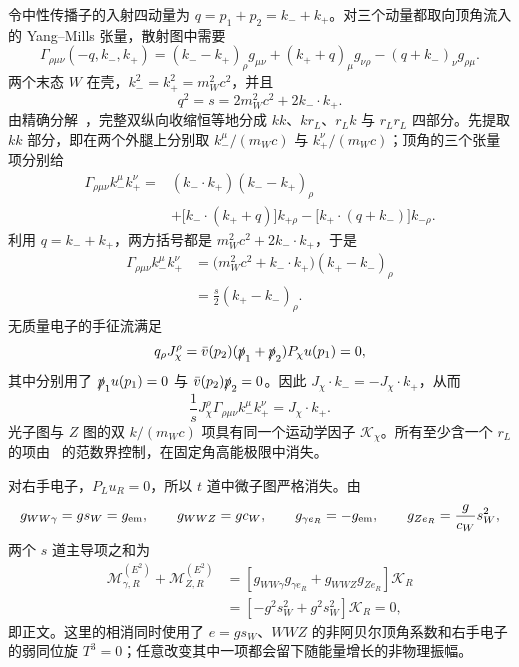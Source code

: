 \begin{derivation}
令中性传播子的入射四动量为 $q=p_1+p_2=k_-+k_+$。对三个动量都取向顶角流入的 Yang--Mills 张量，散射图中需要
\begin{equation*}
\Gamma_{\rho\mu\nu}(-q,k_-,k_+)
=(k_--k_+)_\rho g_{\mu\nu}
 +(k_++q)_\mu g_{\nu\rho}
 -(q+k_-)_\nu g_{\rho\mu}.
\end{equation*}
两个末态 $W$ 在壳，$k_-^2=k_+^2=m_W^2c^2$，并且
\begin{equation*}
q^2=s=2m_W^2c^2+2k_-\!\cdot k_+.
\end{equation*}
由精确分解~，完整双纵向收缩恒等地分成 $kk$、$kr_L$、$r_Lk$ 与 $r_Lr_L$ 四部分。先提取 $kk$ 部分，即在两个外腿上分别取 $k_-^\mu/(m_Wc)$ 与 $k_+^\nu/(m_Wc)$；顶角的三个张量项分别给
\begin{align*}
\Gamma_{\rho\mu\nu}k_-^\mu k_+^\nu
={}&(k_-\!\cdot k_+)(k_--k_+)_\rho\\
&+\bigl[k_-\!\cdot(k_++q)\bigr]k_{+\rho}
-\bigl[k_+\!\cdot(q+k_-)\bigr]k_{-\rho}.
\end{align*}
利用 $q=k_-+k_+$，两方括号都是 $m_W^2c^2+2k_-\!\cdot k_+$，于是
\begin{align*}
\Gamma_{\rho\mu\nu}k_-^\mu k_+^\nu
&=\bigl(m_W^2c^2+k_-\!\cdot k_+\bigr)(k_+-k_-)_\rho\\
&=\frac{s}{2}(k_+-k_-)_\rho .
\end{align*}
无质量电子的手征流满足
\begin{equation*}
q_\rho J_\chi^\rho
=\bar v(p_2)(\slashed p_1+\slashed p_2)P_\chi u(p_1)=0,
\end{equation*}
其中分别用了 $\slashed p_1u(p_1)=0$ 与 $\bar v(p_2)\slashed p_2=0$。因此 $J_\chi\!\cdot k_-=-J_\chi\!\cdot k_+$，从而
\begin{equation*}
\frac{1}{s}J_\chi^\rho
\Gamma_{\rho\mu\nu}k_-^\mu k_+^\nu
=J_\chi\!\cdot k_+.
\end{equation*}
光子图与 $Z$ 图的双 $k/(m_Wc)$ 项具有同一个运动学因子 $\mathcal K_\chi$。所有至少含一个 $r_L$ 的项由~ 的范数界控制，在固定角高能极限中消失。

对右手电子，$P_Lu_R=0$，所以 $t$ 道中微子图严格消失。由
\begin{equation*}
g_{WW\gamma}=gs_W=g_{\rm em},\qquad
 g_{WWZ}=gc_W,\qquad
 g_{\gamma e_R}=-g_{\rm em},\qquad
 g_{Ze_R}=\frac{g}{c_W}s_W^2,
\end{equation*}
两个 $s$ 道主导项之和为
\begin{align*}
\mathcal M_{\gamma,R}^{(E^2)}+\mathcal M_{Z,R}^{(E^2)}
&=\left[g_{WW\gamma}g_{\gamma e_R}+g_{WWZ}g_{Ze_R}\right]\mathcal K_R\\
&=\left[-g^2s_W^2+g^2s_W^2\right]\mathcal K_R=0,
\end{align*}
即正文。这里的相消同时使用了 $e=gs_W$、$WWZ$ 的非阿贝尔顶角系数和右手电子的弱同位旋 $T^3=0$；任意改变其中一项都会留下随能量增长的非物理振幅。
\end{derivation}

